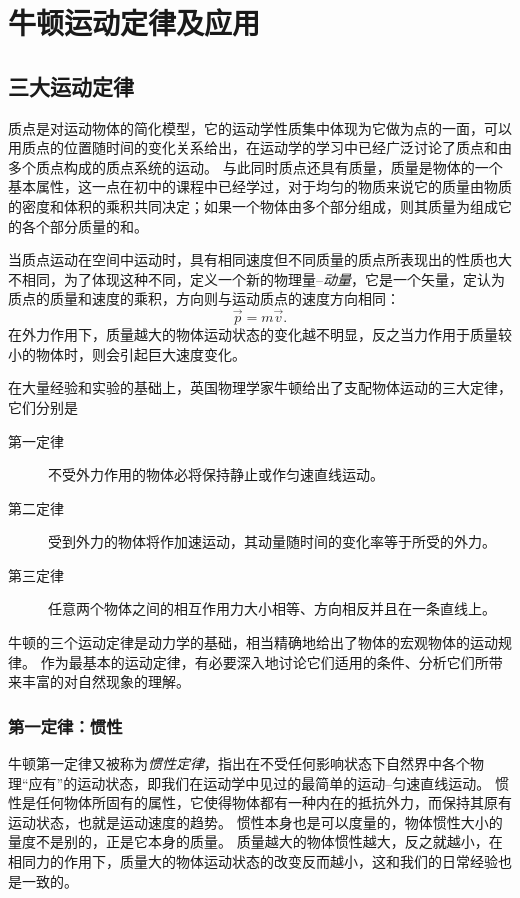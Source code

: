 
\chapter{牛顿运动定律及应用}

\section{三大运动定律}
质点是对运动物体的简化模型，它的运动学性质集中体现为它做为点的一面，可以用质点的位置随时间的变化关系给出，在运动学的学习中已经广泛讨论了质点和由多个质点构成的质点系统的运动。
与此同时质点还具有质量，质量是物体的一个基本属性，这一点在初中的课程中已经学过，对于均匀的物质来说它的质量由物质的密度和体积的乘积共同决定；如果一个物体由多个部分组成，则其质量为组成它的各个部分质量的和。

当质点运动在空间中运动时，具有相同速度但不同质量的质点所表现出的性质也大不相同，为了体现这种不同，定义一个新的物理量--\emph{动量}，它是一个矢量，定认为质点的质量和速度的乘积，方向则与运动质点的速度方向相同：
\begin{equation}\label{eqn: newton-definition-of-momentum}
\vec{p} = m\vec{v}.
\end{equation}
在外力作用下，质量越大的物体运动状态的变化越不明显，反之当力作用于质量较小的物体时，则会引起巨大速度变化。

在大量经验和实验的基础上，英国物理学家牛顿给出了支配物体运动的三大定律，它们分别是
\begin{description}
\item[第一定律]
不受外力作用的物体必将保持静止或作匀速直线运动。
\item[第二定律]
受到外力的物体将作加速运动，其动量随时间的变化率等于所受的外力。
\item[第三定律]
任意两个物体之间的相互作用力大小相等、方向相反并且在一条直线上。
\end{description}
牛顿的三个运动定律是动力学的基础，相当精确地给出了物体的宏观物体的运动规律。
作为最基本的运动定律，有必要深入地讨论它们适用的条件、分析它们所带来丰富的对自然现象的理解。

\subsection{第一定律：惯性}
牛顿第一定律又被称为\emph{惯性定律}，指出在不受任何影响状态下自然界中各个物理“应有”的运动状态，即我们在运动学中见过的最简单的运动--匀速直线运动。
惯性是任何物体所固有的属性，它使得物体都有一种内在的抵抗外力，而保持其原有运动状态，也就是运动速度的趋势。
惯性本身也是可以度量的，物体惯性大小的量度不是别的，正是它本身的质量。
质量越大的物体惯性越大，反之就越小，在相同力的作用下，质量大的物体运动状态的改变反而越小，这和我们的日常经验也是一致的。

